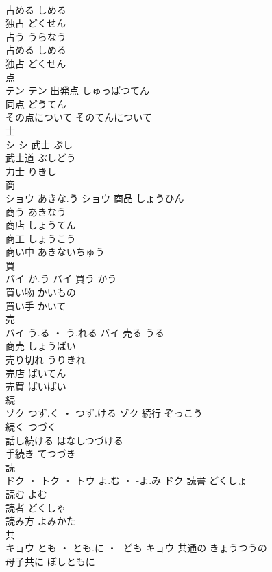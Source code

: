 \documentclass[8pt]{extreport}
\begin{document}
\begin{CJK}{UTF8}{min}
\\	占める	しめる	
\\	独占	どくせん	
\\	占う	うらなう	
\\	占める	しめる	
\\	独占	どくせん	
\\	点	
\\	テン		テン	出発点	しゅっぱつてん	
\\	同点	どうてん	
\\	その点について	そのてんについて	
\\	士	
\\	シ		シ	武士	ぶし	
\\	武士道	ぶしどう	
\\	力士	りきし	
\\	商	
\\	ショウ	あきな.う	ショウ	商品	しょうひん	
\\	商う	あきなう	
\\	商店	しょうてん	
\\	商工	しょうこう	
\\	商い中	あきないちゅう	
\\	買	
\\	バイ	か.う	バイ	買う	かう	
\\	買い物	かいもの	
\\	買い手	かいて	
\\	売	
\\	バイ	う.る ・ う.れる	バイ	売る	うる	
\\	商売	しょうばい	
\\	売り切れ	うりきれ	
\\	売店	ばいてん	
\\	売買	ばいばい	
\\	続	
\\	ゾク	つず.く ・ つず.ける	ゾク	続行	ぞっこう	
\\	続く	つづく	
\\	話し続ける	はなしつづける	
\\	手続き	てつづき	
\\	読	
\\	ドク ・ トク ・ トウ	よ.む ・ -よ.み	ドク	読書	どくしょ	
\\	読む	よむ	
\\	読者	どくしゃ	
\\	読み方	よみかた	
\\	共	
\\	キョウ	とも ・ とも.に ・ -ども	キョウ	共通の	きょうつうの	
\\	母子共に	ぼしともに	

\end{CJK}
\end{document}
